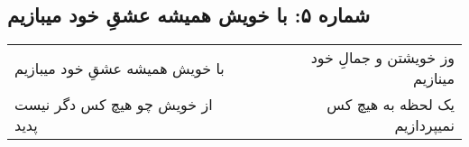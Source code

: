 \begin{center}
\section*{شماره ۵: با خویش همیشه عشقِ خود میبازیم}
\label{sec:005}
\begin{longtable}{l p{0.5cm} r}
با خویش همیشه عشقِ خود میبازیم
&&
وز خویشتن و جمالِ خود مینازیم
\\
از خویش چو هیچ کس دگر نیست پدید
&&
یک لحظه به هیچ کس نمیپردازیم
\\
\end{longtable}
\end{center}
